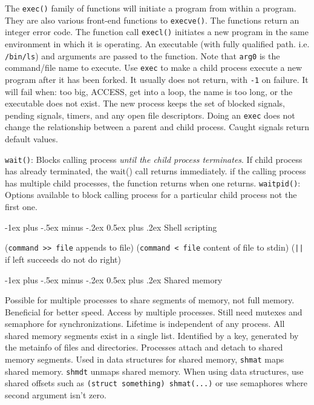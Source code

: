\documentclass[10pt,landscape, a4paper]{article}
\makeatletter
\renewcommand{\subsection}{\@startsection{section}{1}{0mm}%
                                {-1ex plus -.5ex minus -.2ex}%
                                {0.5ex plus .2ex}%
                                {\normalfont\large\bfseries}}
\makeatother
\begin{document}
\begin{multicols}{3}


The \texttt{exec()} family of functions will initiate a program from within a program. 
They are also various front-end functions to \texttt{execve()}.
The functions return an integer error code.
The function call \texttt{execl()} initiates a new program in the same environment 
in which it is operating. An executable (with fully qualified path. i.e. \texttt{/bin/ls}) 
and arguments are passed to the function. Note that \texttt{arg0} is the command/file 
name to execute.
Use \texttt{exec} to make a child process execute a new program
after it has been forked. It usually does not return, with \texttt{-1}
on failure. It will fail when: too big, ACCESS, get into a loop, the name
is too long, or the executable does not exist. The new process keeps the
set of blocked signals, pending signals, timers, and any open file 
descriptors. Doing an \texttt{exec} does not change the relationship
between a parent and child process. Caught signals return default values.



\texttt{wait()}: Blocks calling process \emph{until the child process terminates}. 
If child process has already terminated, the wait() call returns immediately. 
if the calling process has multiple child processes, the function returns when one returns.
\texttt{waitpid()}: Options available to block calling process for a particular 
child process not the first one.

\subsection{Shell scripting}

(\texttt{command >> file} appends to file)
(\texttt{command < file} content of file to stdin)
(\texttt{||} if left succeeds do not do right)



\subsection{Shared memory}

Possible for multiple processes to share segments of memory, 
not full memory. Beneficial for better speed. Access by multiple processes.
Still need mutexes and semaphore for synchronizations. 
Lifetime is independent of any process. All shared memory segments 
exist in a single list. Identified by a key, generated by the metainfo of 
files and directories. Processes attach and detach to shared memory segments.
Used in data structures for shared memory, \texttt{shmat} maps shared memory.
\texttt{shmdt} unmaps shared memory. When using data structures, use shared offsets such as
\texttt{(struct something) shmat(...)} or use semaphores where second argument isn't
zero.


\end{multicols}
\end{document}
